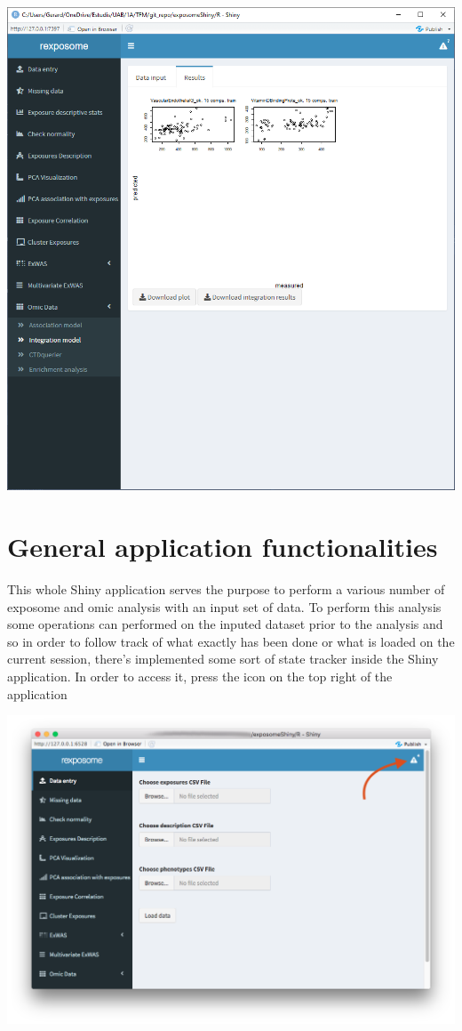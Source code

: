 \documentclass[
]{book}
\begin{document}
\includegraphics{images/analysis12_3.png}

\hypertarget{general-application-functionalities}{%
\chapter{General application functionalities}\label{general-application-functionalities}}

This whole Shiny application serves the purpose to perform a various number of exposome and omic analysis with an input set of data. To perform this analysis some operations can performed on the inputed dataset prior to the analysis and so in order to follow track of what exactly has been done or what is loaded on the current session, there's implemented some sort of state tracker inside the Shiny application. In order to access it, press the icon on the top right of the application

\includegraphics{images/general1.png}
\end{document}

